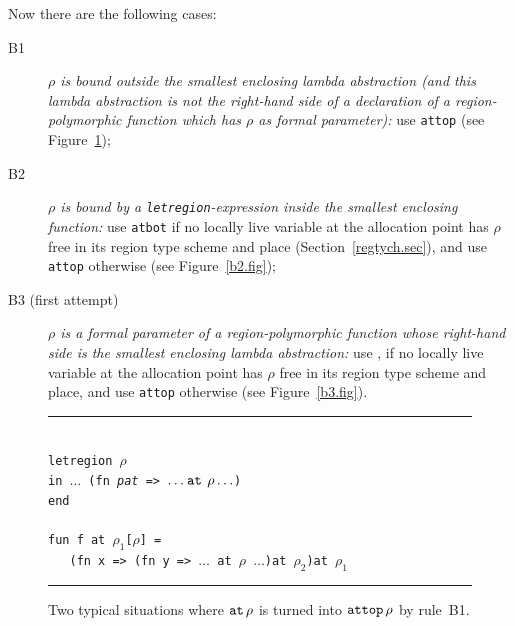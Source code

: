 \documentclass[12pt]{book}
\begin{document}
Now there are the following cases:
\begin{description}
\item[B1] {\it $\rho$ is bound outside the smallest enclosing lambda abstraction
      (and this lambda abstraction is not the right-hand side of a 
      declaration of a region-polymorphic function which has $\rho$ as
      formal parameter):}
      use {\tt attop} (see Figure~\ref{b1.fig});
\item[B2]{\it $\rho$ is bound by a {\tt letregion}-expression inside the
      smallest enclosing function:} use {\tt atbot} if no locally live
      variable at the allocation point has $\rho$ free in its region 
      type scheme and place (Section~\ref{regtych.sec}), and use {\tt attop} otherwise 
      (see Figure~\ref{b2.fig});
\item[B3 (first attempt)]{\it $\rho$ is a formal parameter of a region-polymorphic function
      whose right-hand side is the smallest enclosing lambda abstraction:}
            use , if no locally live
      variable at the allocation point has $\rho$ free in its region type scheme and
      place, and use {\tt attop} otherwise (see Figure~\ref{b3.fig}).
\end{description}
\begin{figure}
\hrule
\begin{center}
\begin{tabbing}
\\
\hskip3cm\=\tt letregion $\rho$\\
       \>\tt in $\ldots$ (fn {\it pat} => $\ldots\mathbin{\hbox{\tt at}}\,\rho\ldots$)\\
       \>\tt end\\
\\
       \>\tt fun f at $\rho_1$[$\rho$] =\\
       \>\tt\ \ \ (fn x => (fn y => $\ldots$ at $\rho$ $\ldots$)at $\rho_2$)at $\rho_1$\\
\end{tabbing}
\end{center}
\caption{Two typical situations where $\mathbin{\hbox{\tt at}}\,\rho$ is turned into $\hbox{\tt attop}\,\rho$
by rule~B1.}
\medskip

\hrule
\label{b1.fig}
\end{figure}
\end{document}
